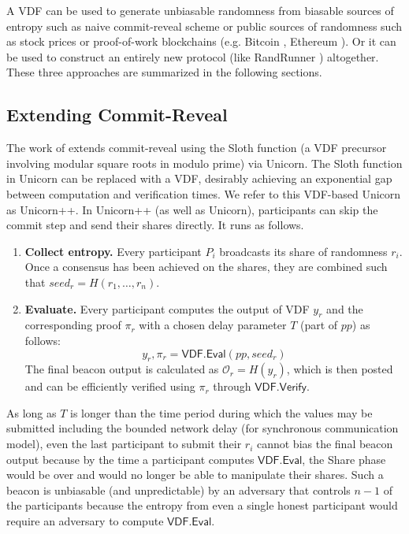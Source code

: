 \documentclass[letterpaper,twocolumn,10pt]{article}
\theoremstyle{definition}
\theoremstyle{remark}
\begin{document}
A VDF can be used to generate unbiasable randomness from biasable sources of entropy such as naive commit-reveal scheme or public sources of randomness such as stock prices or proof-of-work blockchains (e.g. Bitcoin \cite{nakamoto2019bitcoin}, Ethereum \cite{wood2014ethereum}). Or it can be used to construct an entirely new protocol (like RandRunner \cite{schindler2021randrunner}) altogether. These three approaches are summarized in the following sections.

\subsection{Extending Commit-Reveal}
\label{subsection:extending-commit-reveal}
The work of \cite{lenstra2015random} extends commit-reveal using the Sloth function (a VDF precursor involving modular square roots in modulo prime) via Unicorn. The Sloth function in Unicorn can be replaced with a VDF, desirably achieving an exponential gap between computation and verification times. We refer to this VDF-based Unicorn as Unicorn++. In Unicorn++ (as well as Unicorn), participants can skip the commit step and send their shares directly. It runs as follows.
\begin{enumerate}
    \item \textbf{Collect entropy.} Every participant $P_i$ broadcasts its share of randomness $r_i$. Once a consensus has been achieved on the shares, they are combined such that  $seed_r = H(r_1,\ldots, r_n)$.
    \item \textbf{Evaluate.} Every participant computes the output of VDF $y_r$ and the corresponding proof $\pi_r$ with a chosen delay parameter $T$ (part of $pp$) as follows:
    $$y_r, \pi_r = \mathsf{VDF.Eval}(pp, seed_r)$$
    The final beacon output is calculated as $\mathcal{O}_r = H(y_r) $, which is then posted and can be efficiently verified using $\pi_r$ through $\mathsf{VDF.Verify}$.
\end{enumerate}
As long as $T$ is longer than the time period during which the values may be submitted including the bounded network delay (for synchronous communication model), even the last participant to submit their $r_i$ cannot bias the final beacon output because by the time a participant computes $\mathsf{VDF.Eval}$, the Share phase would be over and would no longer be able to manipulate their shares. Such a beacon is unbiasable (and unpredictable) by an adversary that controls $n-1$ of the participants because the entropy from even a single honest participant would require an adversary to compute  $\mathsf{VDF.Eval}$. 
\end{document}
